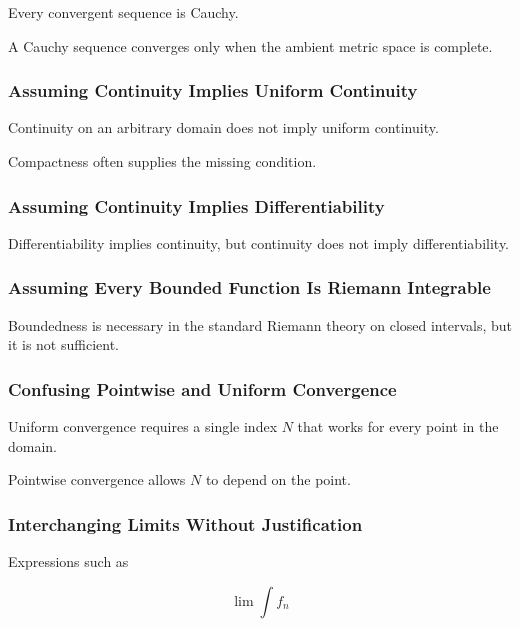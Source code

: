 Every convergent sequence is Cauchy.

A Cauchy sequence converges only when the ambient metric space is complete.

\subsubsection{Assuming Continuity Implies Uniform Continuity}

Continuity on an arbitrary domain does not imply uniform continuity.

Compactness often supplies the missing condition.

\subsubsection{Assuming Continuity Implies Differentiability}

Differentiability implies continuity, but continuity does not imply
differentiability.

\subsubsection{Assuming Every Bounded Function Is Riemann Integrable}

Boundedness is necessary in the standard Riemann theory on closed
intervals, but it is not sufficient.

\subsubsection{Confusing Pointwise and Uniform Convergence}

Uniform convergence requires a single index \(N\) that works for every
point in the domain.

Pointwise convergence allows \(N\) to depend on the point.

\subsubsection{Interchanging Limits Without Justification}

Expressions such as

\[
\lim\int f_n
\]

